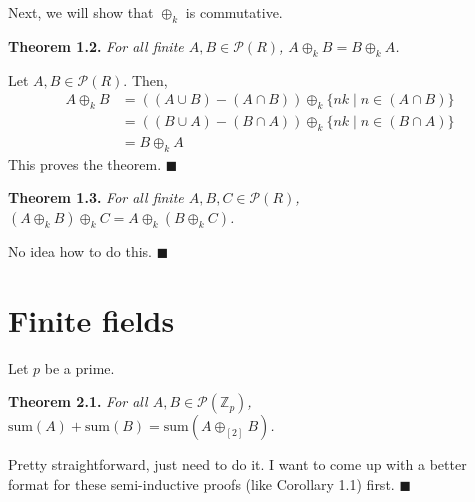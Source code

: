 \documentclass{article}
\newcommand{\sumt}{\text{sum}}
\newcommand{\zee}{\mathbb{Z}}
\begin{document}
Next, we will show that $\oplus_k$ is commutative.

\textbf{Theorem 1.2.} \textit{
    For all finite $A, B \in \mathcal{P}(R)$,
    $A \oplus_k B = B \oplus_k A$.
}

Let $A, B \in \mathcal{P}(R)$. Then,
\[\begin{split}
    A \oplus_k B
    &= ((A \cup B) - (A \cap B)) \oplus_k \{nk \mid n \in (A \cap B)\} \\
    &= ((B \cup A) - (B \cap A)) \oplus_k \{nk \mid n \in (B \cap A)\} \\
    &= B \oplus_k A
\end{split}\]
This proves the theorem. $\blacksquare$

\textbf{Theorem 1.3.} \textit{
    For all finite $A, B, C \in \mathcal{P}(R)$,
    $(A \oplus_k B) \oplus_k C = A \oplus_k (B \oplus_k C)$.
}

No idea how to do this. $\blacksquare$

\section{Finite fields}

Let $p$ be a prime.

\textbf{Theorem 2.1.} \textit{
    For all $A, B \in \mathcal{P}(\zee_p)$,
    $\sumt(A) + \sumt(B) = \sumt(A \oplus_{[2]} B)$.
}

Pretty straightforward, just need to do it.
I want to come up with a better format for these
semi-inductive proofs (like Corollary 1.1)
first. $\blacksquare$
\end{document}
